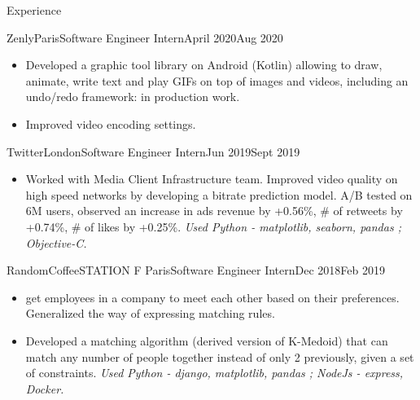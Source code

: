 \documentclass{resume}
\begin{document}
	\begin{rSection}{Experience}
        \begin{job}{Zenly}{Paris}{Software Engineer Intern}{April 2020}{Aug 2020}{
            \begin{itemize}
                \item Developed a graphic tool library on Android (Kotlin) allowing to draw, animate, write text and play GIFs on top of images and videos, including an undo/redo framework: in production work.
                \item Improved video encoding settings.
            \end{itemize}
        }
        \end{job}

		\begin{job}{Twitter}{London}{Software Engineer Intern}{Jun 2019}{Sept 2019}{
            \begin{itemize}
                \item Worked with Media Client Infrastructure team. Improved video quality on high speed networks by developing a bitrate prediction model. A/B tested on 6M users, observed an increase in ads revenue by +0.56\%, \# of retweets by +0.74\%, \# of likes by +0.25\%. \em{Used Python - matplotlib, seaborn, pandas ; Objective-C.}
            \end{itemize}
		}
		\end{job}

		\begin{job}{RandomCoffee}{STATION F Paris}{Software Engineer Intern}{Dec 2018}{Feb 2019}{
            \begin{itemize}
                \item {} get employees in a company to meet each other based on their preferences. Generalized the way of expressing matching rules.
                \item Developed a matching algorithm (derived version of K-Medoid) that can match any number of people together instead of only 2 previously, given a set of constraints. \em{Used Python - django, matplotlib, pandas ; NodeJs - express, Docker.}
            \end{itemize}
		}
		\end{job}


\end{rSection}
\end{document}
